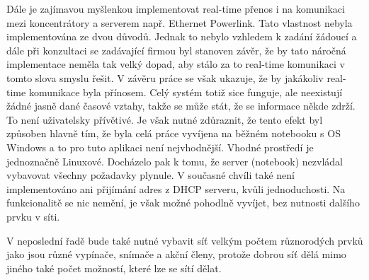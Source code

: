 Dále je zajímavou myšlenkou implementovat real-time přenos i na komunikaci mezi koncentrátory a serverem např. Ethernet Powerlink.  Tato vlastnost nebyla implementována ze dvou důvodů. Jednak to nebylo vzhledem k zadání žádoucí a dále při konzultaci se zadávající firmou byl stanoven závěr, že by tato náročná implementace neměla tak velký dopad, aby stálo za to real-time komunikaci v tomto slova smyslu řešit. V závěru práce se však ukazuje, že by jakákoliv real-time komunikace byla přínosem. Celý systém totiž sice funguje, ale neexistují žádné jasně dané časové vztahy, takže se může stát, že se informace někde zdrží. To není uživatelsky přívětivé. Je však nutné zdůraznit, že tento efekt byl způsoben hlavně tím, že byla celá práce vyvíjena na běžném notebooku s OS Windows a to pro tuto aplikaci není nejvhodnější. Vhodné prostředí je jednoznačně Linuxové. Docházelo pak k tomu, že server (notebook) nezvládal vybavovat všechny požadavky plynule. V současné chvíli také není implementováno ani přijímání adres z DHCP serveru, kvůli jednoduchosti. Na funkcionalitě se nic nemění, je však možné pohodlně vyvíjet, bez nutnosti dalšího prvku v síti.

V neposlední řadě bude také nutné vybavit síť velkým počtem růz\-no\-ro\-dých prvků jako jsou různé vypínače, snímače a akční členy, protože dobrou síť dělá mimo jiného také počet možností, které lze se sítí dělat.
